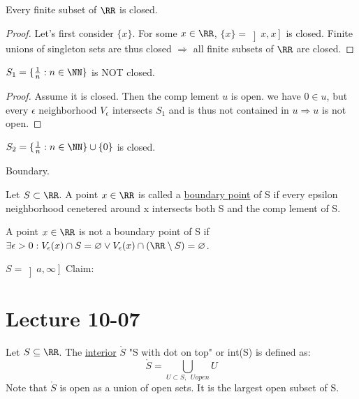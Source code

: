 \documentclass[11pt]{scrartcl}
\begin{document}
\begin{example}
  Every finite subset of $\RR$ is closed.
  \begin{proof}
    Let's first consider $\{x\}$. For some $x \in \RR$, $\{x\} = \left]x, x\right]$ is closed.
    Finite unions of singleton sets are thus closed $\Rightarrow$ all finite subsets of $\RR$ are closed.
  \end{proof}
\end{example}
\begin{example}
  $S_1 = \{\frac{1}{n}: n \in \NN\}$ is NOT closed.
  \begin{proof}
    Assume it is closed. Then the comp lement $u$ is open. we have $0 \in u$, but every $\epsilon$ neighborhood $V_\epsilon$ intersects $S_1$ and is thus not contained in $u \Rightarrow u$ is not open.
  \end{proof}
\end{example}
\begin{example}
  $S_2 = \{\frac{1}{n}: n \in \NN\} \cup \{0\}$ is closed.
\end{example}

\begin{definition}
  Boundary.

  Let $S \subset \RR$. A point $x \in \RR$ is called a \ul{boundary point} of S if every epsilon neighborhood cenetered around x intersects both S and the comp lement of S.

  A point $x \in \RR$ is not a boundary point of S if $\exists \epsilon > 0: V_\epsilon(x) \cap S = \varnothing \vee V_\epsilon(x) \cap (\RR \setminus S) = \varnothing$.
\end{definition}

\begin{example}
  $S = \left]a, \infty\right]$ 
  Claim: 
\end{example}

\section{Lecture 10-07}

\begin{example}
\end{example}

\begin{definition}
  Let $S \subseteq \RR$. The \ul{interior} $\mathring{S}$ "S with dot on top" or int(S) is defined as:
  $$ \mathring{S} = \bigcup_{U \subset S, \ \ U open}U $$
  Note that $\mathring{S}$ is open as a union of open sets.
  It is the largest open subset of S.
\end{definition}
\end{document}

